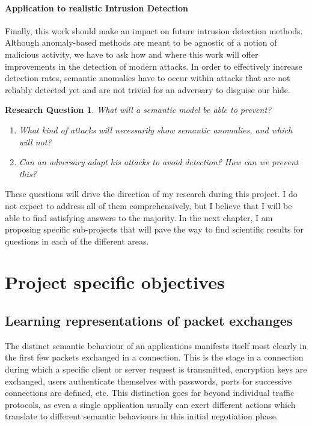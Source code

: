 \documentclass[a4paper,12pt,twoside]{report}
\newtheorem{rquestion}{Research Question}
\begin{document}
\subsubsection{Application to realistic Intrusion Detection}

Finally, this work should make an impact on future intrusion detection methods. Although anomaly-based methods are meant to be agnostic of a notion of malicious activity, we have to ask how and where this work will offer improvements in the detection of modern attacks. In order to effectively increase detection rates, semantic anomalies have to occur within attacks that are not reliably detected yet and are not trivial for an adversary to disguise our hide. 

\begin{rquestion}
What will a semantic model be able to prevent? 
\begin{enumerate}
\item What kind of attacks will necessarily show semantic anomalies, and which will not?
\item Can an adversary adapt his attacks to avoid detection? How can we prevent this?
\end{enumerate}
\end{rquestion}

\vspace{0.8cm}

These questions will drive the direction of my research during this project. I do not expect to address all of them comprehensively, but I believe that I will be able to find satisfying answers to the majority. In the next chapter, I am proposing specific sub-projects that will pave the way to find scientific results for questions in each of the different areas.


\chapter{Project specific objectives}\label{Obj}

\section{Learning representations of packet exchanges}\label{Repr}

The distinct semantic behaviour of an applications manifests itself most clearly in the first few packets exchanged in a connection. This is the stage in a connection during which a specific client or server request is transmitted, encryption keys are exchanged, users authenticate themselves with passwords, ports for successive connections are defined, etc. This distinction goes far beyond individual traffic protocols, as even a single application usually can exert different actions which translate to different semantic behaviours in this initial negotiation phase. 
\end{document}
